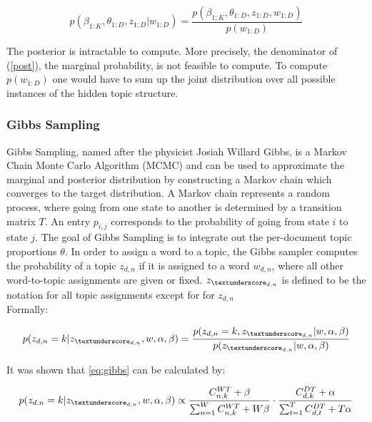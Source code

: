 \documentclass[a4paper,ngerman, english]{atseminar}
\begin{document}
\begin{equation} \label{post}
p(\beta_{1:K}, \theta_{1:D}, z_{1:D} | w_{1:D} ) = \frac{p(\beta_{1:K}, \theta_{1:D}, z_{1:D},w_{1:D} )}{p(w_{1:D})}
\end{equation}

The posterior is intractable to compute. More precisely, the denominator of (\autoref{post}), the marginal probability, is not feasible to 
compute. To compute $p(w_{1:D})$ one would have to sum up the joint distribution over all possible instances of the hidden topic structure.



\subsubsection{Gibbs Sampling}

Gibbs Sampling, named after the physicist Josiah Willard Gibbs, is a Markov Chain Monte Carlo Algorithm (MCMC) and can be used to approximate the marginal and posterior 
distribution by constructing a Markov chain which converges to the target distribution.
A Markov chain represents a random process, where going from one state to another is determined by a transition matrix $T$.
An entry $p_{i,j}$ corresponds to the probability of going from state $i$ to state $j$.
The goal of Gibbs Sampling is to integrate out the per-document topic proportions $\theta$.
\noindent
In order to assign a word to a topic, the Gibbs sampler computes the probability of a topic $z_{d,n}$ if it is assigned to a word $w_{d,n}$, where 
all other word-to-topic assignments are given or fixed. $z_{\textunderscore_ {d,n}}$ is defined to be the notation for all topic assignments except 
for for $z_{d,n}$ \\
Formally:

\begin{equation} \label{eq:gibbs}
p(z_{d,n} = k | z_{\textunderscore_ {d,n}},w,\alpha, \beta) = \frac{p(z_{d,n}=k, z_{\textunderscore_ {d,n}} | w, \alpha, \beta)}{p(z_{\textunderscore_ {d,n}} | w,\alpha, \beta)}
\end{equation}

It was shown \cite{griffiths2004finding} that \autoref{eq:gibbs} can be calculated by:

\begin{equation} \label{eq:gibbs_}
p(z_{d,n} = k | z_{\textunderscore_ {d,n}},w,\alpha, \beta) \propto \frac{C_{n,k}^{WT}+\beta}
{\sum_{n=1}^{W}C_{n,k}^{WT}+W\beta} \cdot \frac{C_{d,k}^{DT}+\alpha}{\sum_{t=1}^{T}C_{d,t}^{DT}+T\alpha}
\end{equation}
\end{document}
